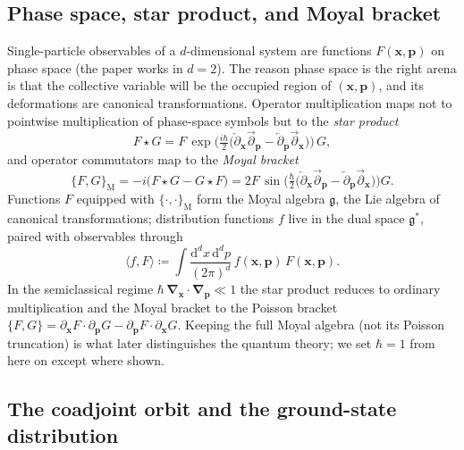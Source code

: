 \documentclass[11pt]{article}
\theoremstyle{remark}
\begin{document}
\subsection{Phase space, star product, and Moyal bracket}

Single-particle observables of a $d$-dimensional system are functions
$F(\bm{x},\bm{p})$ on phase space (the paper works in $d=2$). The reason phase space is
the right arena is that the collective variable will be the occupied region of
$(\bm{x},\bm{p})$, and its deformations are canonical transformations. Operator
multiplication maps not to pointwise multiplication of phase-space symbols but to
the \emph{star product}
\begin{equation}
\label{eq:star}
F\star G = F\,\exp\!\Big(\tfrac{i\hbar}{2}\big(\overleftarrow{\partial}_{\bm{x}}\overrightarrow{\partial}_{\bm{p}}-\overleftarrow{\partial}_{\bm{p}}\overrightarrow{\partial}_{\bm{x}}\big)\Big)\,G ,
\end{equation}
and operator commutators map to the \emph{Moyal bracket}
\begin{equation}
\label{eq:moyal}
\{F,G\}_{\mathrm{M}} = -i\big(F\star G - G\star F\big)
= 2F\,\sin\!\Big(\tfrac{\hbar}{2}\big(\overleftarrow{\partial}_{\bm{x}}\overrightarrow{\partial}_{\bm{p}}-\overleftarrow{\partial}_{\bm{p}}\overrightarrow{\partial}_{\bm{x}}\big)\Big)G .
\end{equation}
Functions $F$ equipped with $\{\cdot,\cdot\}_{\mathrm{M}}$ form the Moyal algebra
$\mathfrak g$, the Lie algebra of canonical transformations; distribution
functions $f$ live in the dual space $\mathfrak g^*$, paired with observables
through
\begin{equation}
\label{eq:pairing}
\langle f, F\rangle \coloneqq \int \frac{\mathrm{d}^dx\,\mathrm{d}^dp}{(2\pi)^d}\,
f(\bm{x},\bm{p})\,F(\bm{x},\bm{p}).
\end{equation}
In the semiclassical regime $\hbar\,\bm{\nabla}_{\bm{x}}\!\cdot\!\bm{\nabla}_{\bm{p}}\ll 1$ the star
product reduces to ordinary multiplication and the Moyal bracket to the Poisson
bracket $\{F,G\}=\partial_{\bm{x}}F\!\cdot\!\partial_{\bm{p}}G-\partial_{\bm{p}}F\!\cdot\!\partial_{\bm{x}}G$.
Keeping the full Moyal algebra (not its Poisson truncation) is what later
distinguishes the quantum theory; we set $\hbar=1$ from here on except where shown.

\subsection{The coadjoint orbit and the ground-state distribution}
\end{document}

